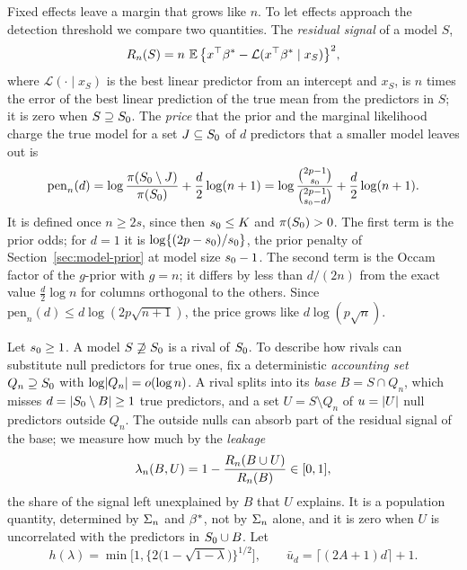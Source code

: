 Fixed effects leave a margin that grows like $n$. To let effects approach the detection threshold we compare two
quantities. The \emph{residual signal} of a model $S$,
\begin{equation}\label{eq:th-resid}
  R_n(S)=n\,\operatorname{\mathbb{E}}\big\{x^\top\beta^*-\mathcal L(x^\top\beta^*\mid x_S)\big\}^2 ,
\end{equation}
where $\mathcal L(\cdot\mid x_S)$ is the best linear predictor from an intercept and $x_S$, is $n$ times the error of
the best linear prediction of the true mean from the predictors in $S$; it is zero when
$S\supseteq S_0$. The \emph{price} that the prior and the marginal likelihood charge the true model for a set
$J\subseteq S_0$ of $d$ predictors that a smaller model leaves out is
\begin{equation}\label{eq:th-price}
  \mathrm{pen}_n(d)=\log\frac{\pi(S_0\setminus J)}{\pi(S_0)}+\frac d2\log(n+1)
  =\log\frac{\binom{2p-1}{s_0}}{\binom{2p-1}{s_0-d}}+\frac d2\log(n+1).
\end{equation}
It is defined once $n\ge2s$, since then $s_0\le K$ and $\pi(S_0)>0$. The first term is the prior odds; for $d=1$ it is
$\log\{(2p-s_0)/s_0\}$, the prior penalty of Section~\ref{sec:model-prior} at model size $s_0-1$. The second term is
the Occam factor of the $g$-prior with $g=n$; it differs by less than $d/(2n)$ from the exact value $\tfrac d2\log n$
for columns orthogonal to the others. Since $\mathrm{pen}_n(d)\le d\log(2p\sqrt{n+1})$, the price grows like
$d\log(p\sqrt n)$.

Let $s_0\ge1$. A model $S\not\supseteq S_0$ is a rival of $S_0$. To describe how rivals can substitute null
predictors for true ones, fix a deterministic \emph{accounting set} $Q_n\supseteq S_0$ with $\log\lvert Q_n\rvert=o(\log n)$.
A rival splits into its \emph{base} $B=S\cap Q_n$, which misses $d=\lvert S_0\setminus B\rvert\ge1$ true predictors, and a set
$U=S\setminus Q_n$ of $u=\lvert U\rvert$ null predictors outside $Q_n$. The outside nulls can absorb part of the residual signal
of the base; we measure how much by the \emph{leakage}
\begin{equation}\label{eq:th-leak}
  \lambda_n(B,U)=1-\frac{R_n(B\cup U)}{R_n(B)}\in[0,1],
\end{equation}
the share of the signal left unexplained by $B$ that $U$ explains. It is a population quantity, determined by $\Sigma_n$
and $\beta^*$, not by $\Sigma_n$ alone, and it is zero when $U$ is uncorrelated with the predictors in $S_0\cup B$. Let
\[
  h(\lambda)=\min\Big[1,\big\{2\big(1-\sqrt{1-\lambda}\big)\big\}^{1/2}\Big],\qquad \bar u_d=\lceil(2A+1)d\rceil+1 .
\]

